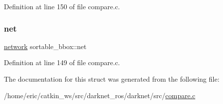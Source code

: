 Definition at line 150 of file compare.\+c.

\mbox{\label{structsortable__bbox_a7f9f2d90e273f7454bbd5e841e23e9e1}} 
\subsubsection{\texorpdfstring{net}{net}}
{\footnotesize\ttfamily \mbox{\hyperlink{structnetwork}{network}} sortable\+\_\+bbox\+::net}



Definition at line 149 of file compare.\+c.



The documentation for this struct was generated from the following file\+:\begin{DoxyCompactItemize}
\item 
/home/eric/catkin\+\_\+ws/src/darknet\+\_\+ros/darknet/src/\mbox{\hyperlink{compare_8c}{compare.\+c}}\end{DoxyCompactItemize}
